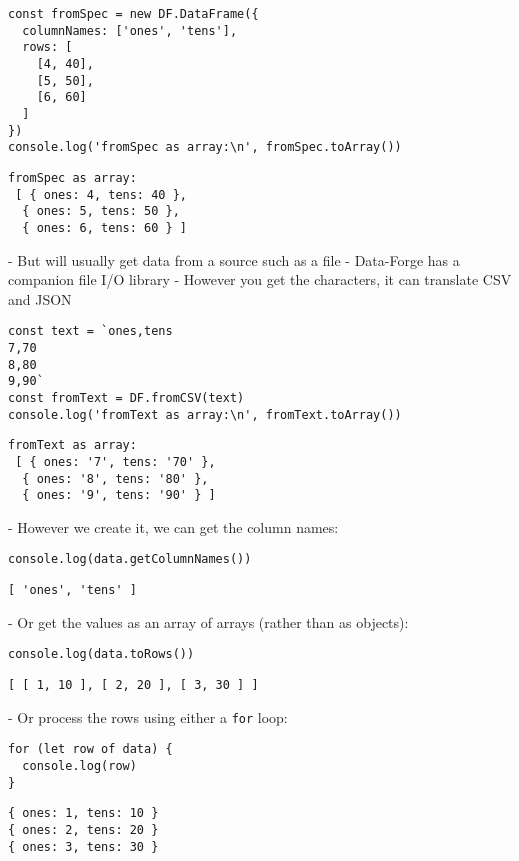 \begin{verbatim}
const fromSpec = new DF.DataFrame({
  columnNames: ['ones', 'tens'],
  rows: [
    [4, 40],
    [5, 50],
    [6, 60]
  ]
})
console.log('fromSpec as array:\n', fromSpec.toArray())
\end{verbatim}

\begin{verbatim}
fromSpec as array:
 [ { ones: 4, tens: 40 },
  { ones: 5, tens: 50 },
  { ones: 6, tens: 60 } ]
\end{verbatim}

-   But will usually get data from a source such as a file
    -   Data-Forge has a companion file I/O library
    -   However you get the characters, it can translate CSV and JSON

\begin{verbatim}
const text = `ones,tens
7,70
8,80
9,90`
const fromText = DF.fromCSV(text)
console.log('fromText as array:\n', fromText.toArray())
\end{verbatim}

\begin{verbatim}
fromText as array:
 [ { ones: '7', tens: '70' },
  { ones: '8', tens: '80' },
  { ones: '9', tens: '90' } ]
\end{verbatim}

-   However we create it, we can get the column names:

\begin{verbatim}
console.log(data.getColumnNames())
\end{verbatim}

\begin{verbatim}
[ 'ones', 'tens' ]
\end{verbatim}

-   Or get the values as an array of arrays (rather than as objects):

\begin{verbatim}
console.log(data.toRows())
\end{verbatim}

\begin{verbatim}
[ [ 1, 10 ], [ 2, 20 ], [ 3, 30 ] ]
\end{verbatim}

-   Or process the rows using either a \texttt{for} loop:

\begin{verbatim}
for (let row of data) {
  console.log(row)
}
\end{verbatim}

\begin{verbatim}
{ ones: 1, tens: 10 }
{ ones: 2, tens: 20 }
{ ones: 3, tens: 30 }
\end{verbatim}

